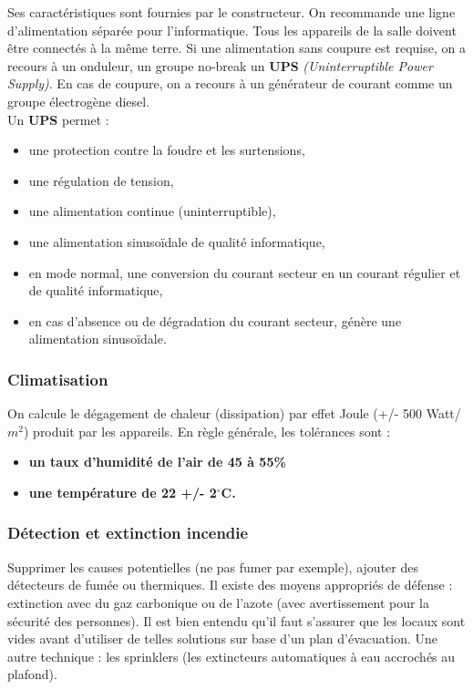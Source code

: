 \documentclass[10pt,a4paper,oneside,titlepage]{report}
\newcommand{\titre}[1]{\textcolor{title}{#1}}
\newcommand{\strong}[1]{\textbf{\titre{#1}}}
\begin{document}
Ses caractéristiques sont fournies par le constructeur. On recommande une ligne d'alimentation séparée pour l'informatique. Tous les appareils de la salle doivent \^etre connectés à la m\^eme terre. Si une alimentation sans coupure est requise, on a
recours à un onduleur, un groupe no-break un \strong{UPS} \textit{(Uninterruptible Power Supply)}. En cas de coupure, on a recours à un générateur de courant comme un groupe électrogène diesel.\\

Un \textbf{UPS} permet :\begin{itemize}
\item une protection contre la foudre et les surtensions,
\item une régulation de tension,
\item une alimentation continue (uninterruptible),
\item une alimentation sinusoïdale de qualité informatique,
\item en mode normal, une conversion du courant secteur en un courant régulier et de qualité informatique,
\item en cas d'absence ou de dégradation du courant secteur, génère une alimentation sinusoïdale.
\end{itemize}

\subsubsection{Climatisation}

On calcule le dégagement de chaleur (dissipation) par effet Joule (+/- 500 Watt/$m^2$) produit par les appareils. En règle générale, les tolérances sont : \begin{itemize}
\item \textbf{un taux d'humidité de l'air de 45 à 55\%}
\item \textbf{une température de 22 +/- 2$^\circ$C.}
\end{itemize}

\subsubsection{Détection et extinction incendie}

Supprimer les causes potentielles (ne pas fumer par exemple), ajouter des détecteurs de fumée ou thermiques. Il existe des moyens appropriés de défense : extinction avec du gaz carbonique ou de l'azote (avec avertissement pour la sécurité des
personnes). Il est bien entendu qu'il faut s'assurer que les locaux sont vides avant d'utiliser de telles solutions sur base d'un plan d'évacuation. Une autre technique : les sprinklers (les extincteurs automatiques à eau accrochés au plafond).
\end{document}
